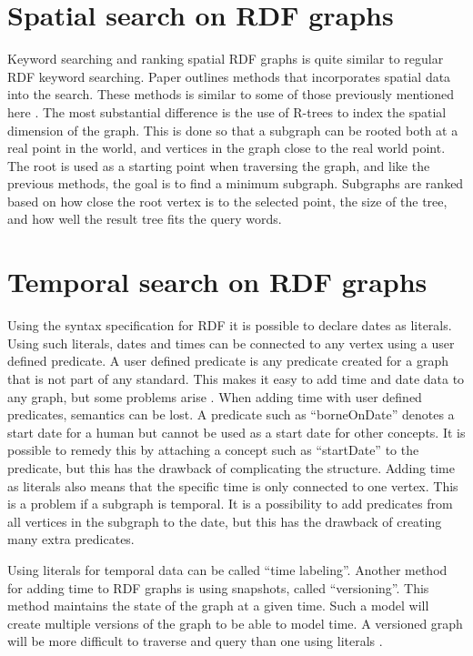 \section{Spatial search on RDF graphs}
Keyword searching and ranking spatial RDF graphs is quite similar to regular RDF keyword searching. Paper \cite{Shi:2016:TRS:2882903.2882941} outlines methods that incorporates spatial data into the search. These methods is similar to some of those previously mentioned here \cite{4812421, Elbassuoni:2011:KSO:2063576.2063615}. The most substantial difference is the use of R-trees to index the spatial dimension of the graph. This is done so that a subgraph can be rooted both at a real point in the world, and vertices in the graph close to the real world point. The root is used as a starting point when traversing the graph, and like the previous methods, the goal is to find a minimum subgraph. Subgraphs are ranked based on how close the root vertex is to the selected point, the size of the tree, and how well the result tree fits the query words.

\section{Temporal search on RDF graphs}
Using the syntax specification for RDF \cite{beckett2004rdf} it is possible to declare dates as literals. Using such literals, dates and times can be connected to any vertex using a user defined predicate. A user defined predicate is any predicate created for a graph that is not part of any standard. This makes it easy to add time and date data to any graph, but some problems arise \cite{tappolet2009applied}. When adding time with user defined predicates, semantics can be lost. A predicate such as ``borneOnDate'' denotes a start date for a human but cannot be used as a start date for other concepts. It is possible to remedy this by attaching a concept such as ``startDate'' to the predicate, but this has the drawback of complicating the structure. Adding time as literals also means that the specific time is only connected to one vertex. This is a problem if a subgraph is temporal. It is a possibility to add predicates from all vertices in the subgraph to the date, but this has the drawback of creating many extra predicates.

Using literals for temporal data can be called ``time labeling''. Another method for adding time to RDF graphs is using snapshots, called ``versioning''. This method maintains the state of the graph at a given time. Such a model will create multiple versions of the graph to be able to model time. A versioned graph will be more difficult to traverse and query than one using literals \cite{gutierrez2006introducing}. 

